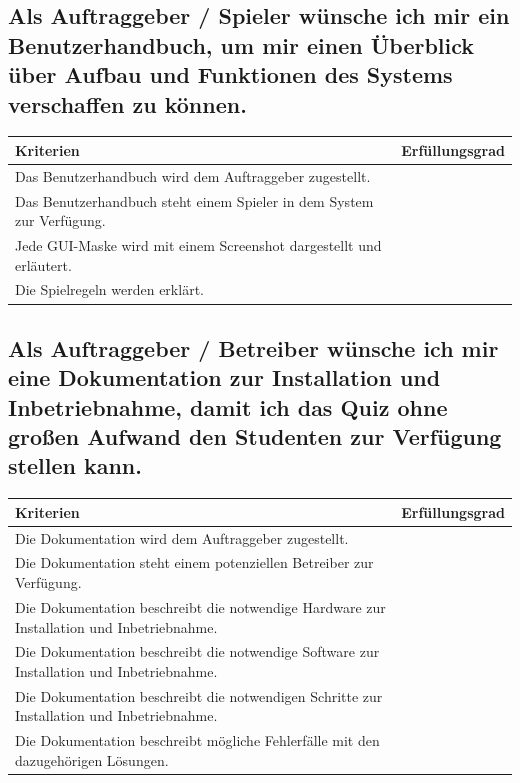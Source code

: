 \documentclass[a4paper,11pt,listof=numbered,glossary=totoc,parskip=half,toc=bib]{scrreprt}
\begin{document}
\begin{appendices}
\begin{tabularx}{\textwidth}{Xr}
			\bottomrule
		\end{tabularx}	
				
		\subsection{Als Auftraggeber / Spieler wünsche ich mir ein Benutzerhandbuch, um mir einen Überblick über
Aufbau und Funktionen des Systems verschaffen zu können.}
		\begin{tabularx}{\textwidth}{Xr}
			
			Kriterien & Erfüllungsgrad \\
			\midrule
		Das Benutzerhandbuch wird dem Auftraggeber zugestellt. & \\
		Das Benutzerhandbuch steht einem Spieler in dem System zur Verfügung. & \\
		Jede GUI-Maske wird mit einem Screenshot dargestellt und erläutert. & \\
		Die Spielregeln werden erklärt. & \\
			\bottomrule
		\end{tabularx}	
		
		\subsection{Als Auftraggeber / Betreiber wünsche ich mir eine Dokumentation zur Installation und
Inbetriebnahme, damit ich das Quiz ohne großen Aufwand den Studenten zur Verfügung stellen
kann.}
		\begin{tabularx}{\textwidth}{Xr}
			
			Kriterien & Erfüllungsgrad \\
			\midrule
		Die Dokumentation wird dem Auftraggeber zugestellt. & \\
		Die Dokumentation steht einem potenziellen Betreiber zur Verfügung. & \\
		Die Dokumentation beschreibt die notwendige Hardware zur Installation und Inbetriebnahme. & \\
		Die Dokumentation beschreibt die notwendige Software zur Installation und Inbetriebnahme. & \\
		Die Dokumentation beschreibt die notwendigen Schritte zur Installation und Inbetriebnahme. & \\
		Die Dokumentation beschreibt mögliche Fehlerfälle mit den dazugehörigen Lösungen. & \\
		
			\bottomrule
		\end{tabularx}	


\end{appendices}
\end{document}
